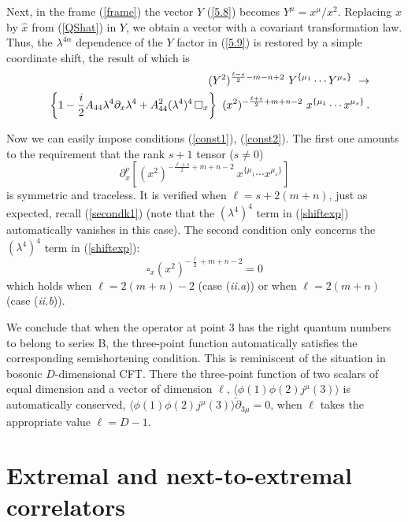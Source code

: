\documentclass[a4paper,11pt]{article}
\begin{document}
Next, in the frame (\ref{frame}) the vector $Y$ (\ref{5.8}) becomes $Y^\mu =
x^\mu/x^2$. Replacing $x$ by $\hat x$ from (\ref{QShat}) in $Y$, we obtain a
vector with a covariant transformation law. Thus, the $\lambda^{4\alpha}$
dependence of the $Y$ factor in (\ref{5.9}) is restored  by a simple coordinate
shift, the result of which is
\begin{eqnarray}
  &&\hskip-1cm (Y^2)^{\frac{\ell-s}{2}-m-n+2}\ Y^{\{\mu_1}\cdots Y^{\mu_s\}} \ \rightarrow  \nonumber\\
  && \left\{1 - \frac{i}{2} A_{44} \lambda^{4} \partial_x \lambda^{4} +A^2_{44}
(\lambda^{4})^4 \, \square_x \right\}\ (x^2)^{-\frac{\ell+s}{2}+m+n-2}\
x^{\{\mu_1}\cdots x^{\mu_s\}}\,. \label{shiftexp}
\end{eqnarray}


Now we can easily impose conditions (\ref{const1}), (\ref{const2}). The first
one amounts to the requirement that the rank $s+1$ tensor ($s\neq0$)
\begin{equation}\label{cst1}
  \partial_x^{\nu} \left[ (x^2)^{-\frac{\ell+s}{2}+m+n-2}\
x^{\{\mu_1}\cdots x^{\mu_s\}} \right]
\end{equation}
is symmetric and traceless. It is verified when $\ell = s + 2(m+n)$, just as
expected, recall (\ref{secondk1}) (note that  the $(\lambda^{4})^4$ term in
(\ref{shiftexp}) automatically vanishes in this case). The second condition
only concerns the $(\lambda^{4})^4$ term in (\ref{shiftexp}):
\begin{equation}\label{cst2}
  \square_x (x^2)^{-\frac{\ell}{2}+m+n-2}  = 0
\end{equation}
which holds when $\ell = 2(m+n)-2$ (case ({\it ii.a})) or when $\ell = 2(m+n)$
(case ({\it ii.b})).

We conclude that when the operator at point 3 has the right quantum numbers to
belong to series B, the three-point function automatically satisfies the
corresponding semishortening condition. This is reminiscent of the situation in
bosonic $D$-dimensional CFT. There the three-point function of two scalars of
equal dimension and a vector of dimension $\ell$, $\langle\phi(1)\phi(2)
j^\mu(3)\rangle$ is automatically conserved, $\langle\phi(1)\phi(2)
j^\mu(3)\rangle \overleftarrow{\partial}_{3\mu} =0$, when $\ell$ takes the
appropriate value $\ell=D-1$.





\section{Extremal and next-to-extremal correlators}
\end{document}
